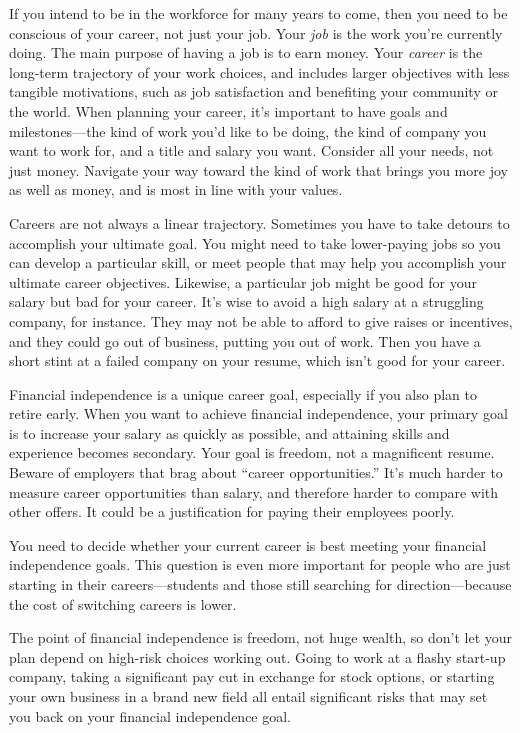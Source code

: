 If you intend to be in the workforce for many years to come, then you need to be conscious of your career, not just your job. Your \emph{job} is the work you're currently doing. The main purpose of having a job is to earn money. Your \emph{career} is the long-term trajectory of your work choices, and includes larger objectives with less tangible motivations, such as job satisfaction and benefiting your community or the world. When planning your career, it's important to have goals and milestones---the kind of work you'd like to be doing, the kind of company you want to work for, and a title and salary you want. Consider all your needs, not just money. Navigate your way toward the kind of work that brings you more joy as well as money, and is most in line with your values.

Careers are not always a linear trajectory. Sometimes you have to take detours to accomplish your ultimate goal. You might need to take lower-paying jobs so you can develop a particular skill, or meet people that may help you accomplish your ultimate career objectives. Likewise, a particular job might be good for your salary but bad for your career. It's wise to avoid a high salary at a struggling company, for instance. They may not be able to afford to give raises or incentives, and they could go out of business, putting you out of work. Then you have a short stint at a failed company on your resume, which isn't good for your career.

Financial independence is a unique career goal, especially if you also plan to retire early. When you want to achieve financial independence, your primary goal is to increase your salary as quickly as possible, and attaining skills and experience becomes secondary. Your goal is freedom, not a magnificent resume. Beware of employers that brag about ``career opportunities.'' It's much harder to measure career opportunities than salary, and therefore harder to compare with other offers. It could be a justification for paying their employees poorly.

You need to decide whether your current career is best meeting your financial independence goals. This question is even more important for people who are just starting in their careers---students and those still searching for direction---because the cost of switching careers is lower.

The point of financial independence is freedom, not huge wealth, so don't let your plan depend on high-risk choices working out. Going to work at a flashy start-up company, taking a significant pay cut in exchange for stock options, or starting your own business in a brand new field all entail significant risks that may set you back on your financial independence goal.

